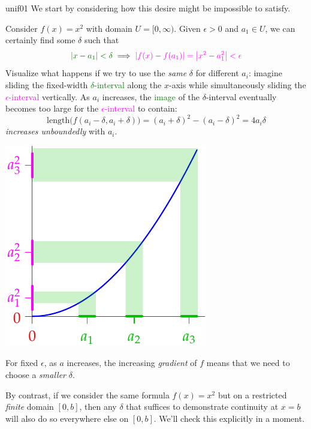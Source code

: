 \begin{example}{}{unif01}
	We start by considering how this desire might be impossible to satisfy.\par
	\begin{minipage}[t]{0.6\linewidth}\vspace{-3pt}
		Consider $f(x)=x^2$ with domain $U=[0,\infty)$. Given $\epsilon>0$ and $a_1\in U$, we can certainly find some\footnotemark{} $\delta$ such that
		\[
			\textcolor{Green}{\nm{x-a_1}<\delta}\implies \textcolor{Magenta}{\nm{f(x)-f(a_1)}=\nm{x^2-a_1^2}<\epsilon}
		\]
		Visualize what happens if we try to use the \emph{same} $\delta$ for different $a_i$: imagine sliding the fixed-width \textcolor{Green}{$\delta$-interval} along the $x$-axis while simultaneously sliding the \textcolor{Magenta}{$\epsilon$-interval} vertically. As $a_i$ increases, the \textcolor{Green}{image} of the $\delta$-interval eventually becomes too large for the \textcolor{Magenta}{$\epsilon$-interval} to contain:
		\[
			\text{length}\bigl(f(a_i-\delta,a_i+\delta)\bigr) =(a_i+\delta)^2-(a_i-\delta)^2=4a_i\delta
		\]
		\emph{increases unboundedly} with $a_i$.
	\end{minipage}
	\hfill
	\begin{minipage}[t]{0.39\linewidth}\vspace{0pt}
		\flushright\includegraphics{unifcont}
	\end{minipage}\smallbreak
	
	For fixed $\epsilon$, as $a$ increases, the increasing \emph{gradient} of $f$ means that we need to choose a \emph{smaller} $\delta$.\medbreak
	
	By contrast, if we consider the same formula $f(x)=x^2$ but on a restricted \emph{finite} domain $[0,b]$, then any $\delta$ that suffices to demonstrate continuity at $x=b$ will also do so everywhere else on $[0,b]$. We'll check this explicitly in a moment.
\end{example}

